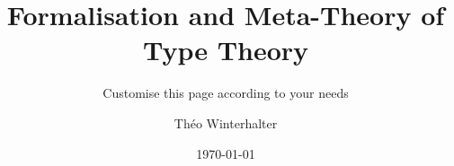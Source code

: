\documentclass[
  fontsize=10pt,
  twoside=false
]{kaobook}
\begin{document}
\setmainfont[
	Ligatures=TeX,
	ItalicFont = Fira Sans Light Italic,
	BoldFont = Fira Sans,
	BoldItalicFont = Fira Sans Italic
]{Fira Sans Light}
\setmonofont[Ligatures=TeX]{Fira Mono}


\titlehead{Some text}
\subject{PhD Thesis}

\title{Formalisation and Meta-Theory of Type Theory}
\subtitle{Customise this page according to your needs}

\author{Théo Winterhalter}

\date{\today}

\publishers{An Awesome Publisher}


\frontmatter %




\makeatletter
\uppertitleback{\@titlehead} %
\end{document}
